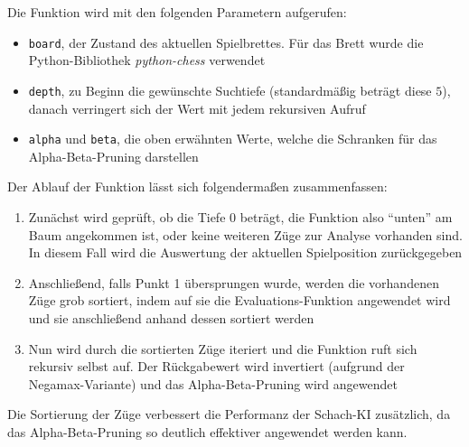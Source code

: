 Die Funktion wird mit den folgenden Parametern aufgerufen:

\begin{itemize}
    \item \texttt{board}, der Zustand des aktuellen Spielbrettes. Für das Brett wurde die Python-Bibliothek \textit{python-chess} verwendet
    \item \texttt{depth}, zu Beginn die gewünschte Suchtiefe (standardmäßig beträgt diese $5$), danach verringert sich der Wert mit jedem rekursiven Aufruf
    \item \texttt{alpha} und \texttt{beta}, die oben erwähnten Werte, welche die Schranken für das Alpha-Beta-Pruning darstellen
\end{itemize}

Der Ablauf der Funktion lässt sich folgendermaßen zusammenfassen:

\begin{enumerate}
    \item Zunächst wird geprüft, ob die Tiefe $0$ beträgt, die Funktion also "`unten"' am Baum angekommen ist, oder keine weiteren Züge zur Analyse vorhanden sind. In diesem Fall wird die Auswertung der aktuellen Spielposition zurückgegeben
    \item Anschließend, falls Punkt 1 übersprungen wurde, werden die vorhandenen Züge grob sortiert, indem auf sie die Evaluations-Funktion angewendet wird und sie anschließend anhand dessen sortiert werden
    \item Nun wird durch die sortierten Züge iteriert und die Funktion ruft sich rekursiv selbst auf. Der Rückgabewert wird invertiert (aufgrund der Negamax-Variante) und das Alpha-Beta-Pruning wird angewendet
\end{enumerate}

Die Sortierung der Züge verbessert die Performanz der Schach-KI zusätzlich, da das Alpha-Beta-Pruning so deutlich effektiver angewendet werden kann.